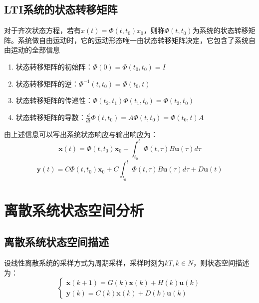 \subsection{LTI系统的状态转移矩阵}

对于齐次状态方程，若有$x(t) = \Phi (t,t_0) x_0$，则称$\Phi(t,t_0)$为系统的状态转移矩阵。系统做自由运动时，它的运动形态唯一由状态转移矩阵决定，它包含了系统自由运动的全部信息

\begin{property}[状态转移矩阵的性质]
    \begin{enumerate}
        \item 状态转移矩阵的初始阵：$\Phi(0) = \Phi(t_0,t_0) = I$
        \item 状态转移矩阵的逆：$\Phi^{-1} (t,t_0) = \Phi(t_0,t)$
        \item 状态转移矩阵的传递性：$\Phi(t_2,t_1)\Phi(t_1,t_0) = \Phi(t_2,t_0)$
        \item 状态转移矩阵的导数：$\frac{d}{dt} \Phi(t,t_0) = A \Phi(t,t_0) = \Phi(t_0,t) A$
    \end{enumerate}
\end{property}

由上述信息可以写出系统状态响应与输出响应为：
\begin{equation*}
    \bm{x}(t) = \Phi(t,t_0)\bm{x}_0 + \int_{t_0}^t \Phi(t,\tau) B \bm{u}(\tau) d\tau
\end{equation*}
\begin{equation*}
    \bm{y}(t) = C \Phi(t,t_0) \bm{x}_0 +C \int_{t_0}^t \Phi(t,\tau) B \bm{u}(\tau) d\tau + D \bm{u}(t)
\end{equation*}

\section{离散系统状态空间分析}

\subsection{离散系统状态空间描述}

设线性离散系统的采样方式为周期采样，采样时刻为$kT,k\in N$，则状态空间描述为：
\begin{equation*}
    \begin{cases}
        \dot{\bm{x}}(k+1) = G(k)\bm{x}(k) + H(k) \bm{u}(k)\\
        \bm{y}(k) = C(k) \bm{x}(k) + D(k) \bm{u}(k)
    \end{cases}
\end{equation*}

